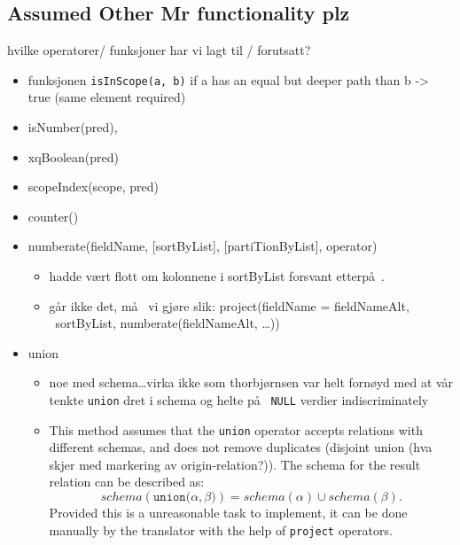 \subsection{Assumed Other Mr functionality plz}
\label{sect:method:marsAddedOperators}
hvilke operatorer/ funksjoner har vi lagt til / forutsatt?
\begin{itemize}
  	\item funksjonen \verb!isInScope(a, b)! if a has an equal but deeper path than
		b -> true (same element required) 
	\item isNumber(pred), 
	\item xqBoolean(pred)
	\item scopeIndex(scope, pred)
	\item counter()
	\item numberate(fieldName, [sortByList], [partiTionByList], operator) 
		\begin{itemize}
        	\item hadde v\ae rt flott om kolonnene i sortByList forsvant etterp\aa~.
        	\item g\aa r ikke det, m\aa~ vi gj\o re slik: project(fieldName = fieldNameAlt, ~sortByList,
        	numberate(fieldNameAlt, \ldots))
        \end{itemize}
	\item union
		\begin{itemize}
			  \item noe med schema\ldots virka ikke som thorbj\o rnsen var helt forn\o yd
				  med at v\aa r tenkte \texttt{union} dret i schema og helte p\aa~
				  \texttt{NULL} verdier indiscriminately
			\item This method assumes that the \texttt{union} operator accepts relations with
different schemas, and does not remove duplicates (disjoint union (hva skjer med markering av origin-relation?)).
The schema for the result relation can be described as:
\begin{equation*}
schema(\texttt{union(}\alpha, \beta\texttt{)}) = schema(\alpha) \cup
schema(\beta).
\end{equation*}
Provided this is a
unreasonable task to implement, it can be done manually by the translator with
the help of \texttt{project} operators.		
        \end{itemize}	
\end{itemize}
